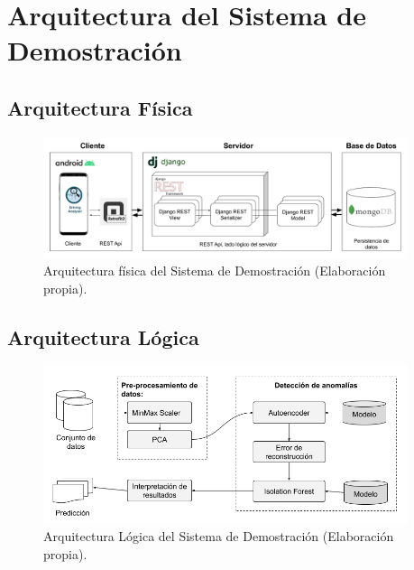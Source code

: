  

\chapter{Arquitectura del Sistema de Demostraci\'{o}n} %

\label{chapter:AppendixB} %

\section{Arquitectura F\'{i}sica}

\begin{figure}[h!]
  \begin{center}	\includegraphics[width=0.95\textwidth, fbox]{imagenes/Apendices/Arquitectura}
  \caption{Arquitectura f\'{i}sica del Sistema de Demostraci\'{o}n (Elaboraci\'{o}n propia).}
  \label{fig:arq_fis}  
  \end{center}
\end{figure}
\newpage
\section{Arquitectura L\'{o}gica}

\begin{figure}[h!]
  \begin{center}	\includegraphics[width=0.95\textwidth, fbox]{imagenes/Apendices/arquitectura_logica}
  \caption{Arquitectura L\'{o}gica del Sistema de Demostraci\'{o}n (Elaboraci\'{o}n propia).}
  \label{fig:arq_log}  
  \end{center}
\end{figure}